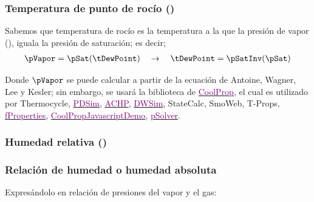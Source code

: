 \eqTotalPressure


\subsubsection{Temperatura de punto de rocío (\texorpdfstring{\tDewPoint}{Troc})}

Sabemos que temperatura de rocío es la temperatura a la que la presión de vapor (\pVapor), iguala la presión de saturación; es decir;
\begin{align}
    \pVapor = \pSat(\tDewPoint) \quad \rightarrow \quad \tDewPoint = \pSatInv(\pSat)
\end{align}

Donde $\pVapor$ se puede calcular a partir de la ecuación de Antoine, Wagner, Lee y Kesler; sin embargo, se usará la biblioteca de \href{https://coolprop.org}{\textcolor{purple}{CoolProp}}, el cual es utilizado por Thermocycle, \href{https://pdsim.sourceforge.net/}{\textcolor{purple}{PDSim}}, \href{https://achp.sourceforge.net/ACHPGUI/Tutorial.html#getting-started}{\textcolor{purple}{ACHP}}, \href{https://sourceforge.net/projects/dwsim/}{\textcolor{purple}{DWSim}}, StateCalc, SmoWeb, T-Props, \href{https://app.fproperties.org/}{\textcolor{purple}{fProperties}}, \href{https://github.com/dvd101x/web-thermodynamics}{\textcolor{purple}{CoolPropJavascriptDemo}}, \href{https://app.psolver.org/app/}{\textcolor{purple}{pSolver}}.

\subsubsection{Humedad relativa (\texorpdfstring{\relativeHumidity[]{}}{phi})}
    \eqnRelativeHumidity



\subsubsection{Relación de humedad o humedad absoluta}
    \eqAbsoluteHumidity
    Expresándolo en relación de presiones del vapor y el gas:
    \eqMassToMolOfVaporAndGas
    
